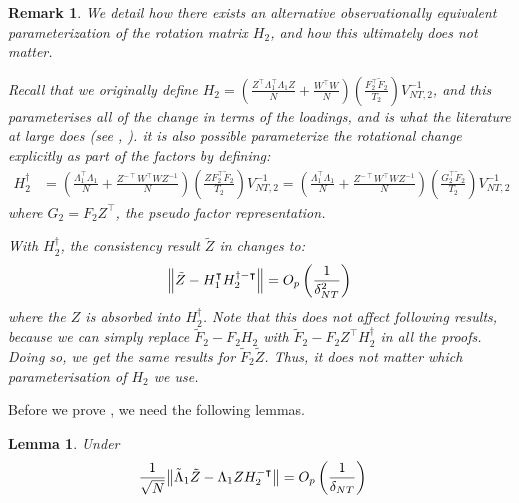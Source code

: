 \documentclass[12pt]{article}
\newtheorem{lemma}{Lemma}
\newtheorem{remark}{Remark}
\newcommand*{\tran}{\intercal}
\theoremstyle{plain}
\numberwithin{equation}{section}
\begin{document}
\begin{remark}
\label{prf:alternative_rotation}
We detail how there exists an alternative observationally equivalent parameterization of the rotation matrix $H_2$, and how this ultimately does not matter.

Recall that we originally define $H_2 = \left( \frac{Z^\tran \Lambda_1^\tran \Lambda_1 Z}{N} + \frac{W^\tran W}{N} \right) \left( \frac{F_2^\tran \tilde{F}_2}{T_2} \right) V_{NT, 2}^{-1}$, and this parameterises all of the change in terms of the loadings, and is what the literature at large does (see \textcite{baltagi_identification_2017}, \textcite{han_tests_2015}). it is also possible parameterize the rotational change explicitly as part of the factors by defining:
\begin{align}
H_2^\dagger &= \left( \frac{\Lambda_1^\tran \Lambda_1}{N} + \frac{Z^{- \tran}W^\tran W Z^{-1}}{N} \right) \left( \frac{Z F_2^\tran \tilde{F}_2}{T_2} \right) V_{NT, 2}^{-1} = \left( \frac{\Lambda_1^\tran \Lambda_1}{N} + \frac{Z^{- \tran}W^\tran W Z^{-1}}{N} \right) \left( \frac{G_2^\tran \tilde{F}_2}{T_2} \right) V_{NT, 2}^{-1} 
\end{align}
where $G_2 = F_2 Z^\tran$, the pseudo factor representation. 

With $H_2^\dagger$, the consistency result $\tilde{Z}$ in  changes to:
\begin{align}
\norm{ 
\tilde{Z} - H_1^\tran H_2^{\dagger -\tran}
} = \Opdeltasq
\end{align}
where the $Z$ is absorbed into $H_2^\dagger$. Note that this does not affect following results, because we can simply replace $\tilde{F}_2 - F_2 H_2$ with $\tilde{F}_2 - F_2 Z^\tran H_2^\dagger$ in all the proofs. Doing so, we get the same results for $\tilde{F}_2 \tilde{Z}$. Thus, it does not matter which parameterisation of $H_2$ we use. 
\end{remark} 

Before we prove , we need the following lemmas.

\begin{lemma}
\label{lem:w_consistency:1}
Under 
\begin{align*}
\frac{1}{\sqrt{N}} \norm{
\tilde{\Lambda}_1 \tilde{Z} - \Lambda_1 Z H_2^{- \tran}
}
&= \Opdelta
\end{align*}
\end{lemma}
\end{document}
